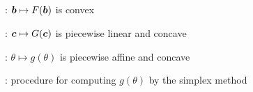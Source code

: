 \subsection*{}
\item {}: \(\bm{b}\mapsto F(\bm{b})\) is convex
\item {}: \(\bm{c}\mapsto G(\bm{c})\)
is piecewise linear and concave
\item {}: \(\theta\mapsto g(\theta)\)
is piecewise affine and concave
\item {}: procedure for computing \(g(\theta)\) by the simplex method
